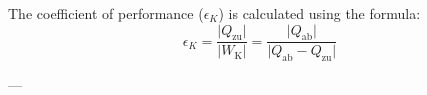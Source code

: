The coefficient of performance (\(\epsilon_K\)) is calculated using the formula:  
\[
\epsilon_K = \frac{\lvert Q_{\text{zu}} \rvert}{\lvert W_{\text{K}} \rvert} = \frac{\lvert Q_{\text{ab}} \rvert}{\lvert Q_{\text{ab}} - Q_{\text{zu}} \rvert}
\]

---